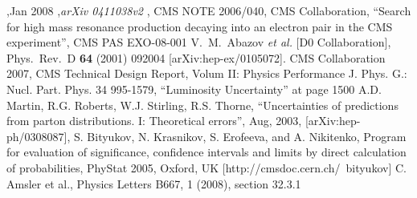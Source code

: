 \documentclass{cmspaper}
\begin{document}
\begin{linenumbers}
\begin{thebibliography}{}
,Jan 2008 ,{\em arXiv 0411038v2}
, CMS NOTE 2006/040,
 {CMS Collaboration, ``Search for high mass resonance production decaying into an electron pair in the CMS experiment''}, CMS PAS EXO-08-001
  V.~M.~Abazov {\it et al.}  [D0 Collaboration], 	 
  Phys.\ Rev.\  D {\bf 64} (2001) 092004 	 
  [arXiv:hep-ex/0105072]. 	 
 {CMS Collaboration 2007, CMS Technical Design Report, Volum II: Physics Performance} 
J. Phys. G.: Nucl. Part. Phys. 34 995-1579, ``Luminosity Uncertainty'' at page 1500
 {A.D. Martin, R.G. Roberts, W.J. Stirling, R.S. Thorne, 
``Uncertainties of predictions from parton distributions. I: Theoretical errors'', Aug, 2003, [arXiv:hep-ph/0308087]},
 S. Bityukov, N. Krasnikov, S. Erofeeva, and A. Nikitenko, Program for evaluation of significance,
  confidence intervals and limits by direct calculation of probabilities, PhyStat 2005, Oxford, UK 
  [http://cmsdoc.cern.ch/~bityukov]
  C. Amsler et al., Physics Letters B667, 1 (2008), section 32.3.1
  
\end{thebibliography}

\end{linenumbers}
\end{document}
